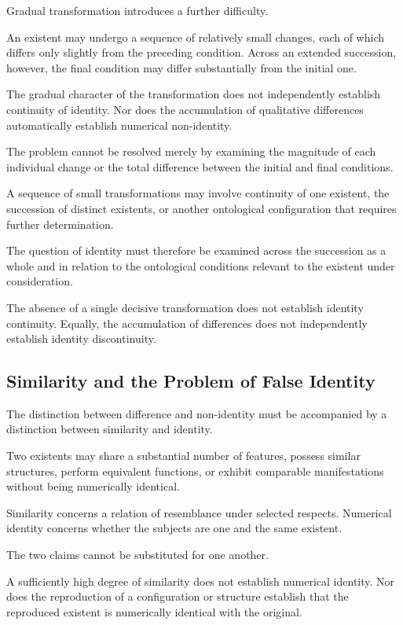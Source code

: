Gradual transformation introduces a further difficulty.

An existent may undergo a sequence of relatively
small changes, each of which differs only slightly
from the preceding condition. Across an extended
succession, however, the final condition may differ
substantially from the initial one.

The gradual character of the transformation does
not independently establish continuity of identity.
Nor does the accumulation of qualitative differences
automatically establish numerical non-identity.

The problem cannot be resolved merely by examining
the magnitude of each individual change or the total
difference between the initial and final conditions.

A sequence of small transformations may involve
continuity of one existent, the succession of distinct
existents, or another ontological configuration
that requires further determination.

The question of identity must therefore be examined
across the succession as a whole and in relation
to the ontological conditions relevant to the
existent under consideration.

The absence of a single decisive transformation
does not establish identity continuity. Equally,
the accumulation of differences does not independently
establish identity discontinuity.

\subsection{Similarity and the Problem of False Identity}

The distinction between difference and non-identity
must be accompanied by a distinction between similarity
and identity.

Two existents may share a substantial number of
features, possess similar structures, perform
equivalent functions, or exhibit comparable
manifestations without being numerically identical.

Similarity concerns a relation of resemblance
under selected respects. Numerical identity concerns
whether the subjects are one and the same existent.

The two claims cannot be substituted for one another.

A sufficiently high degree of similarity does not
establish numerical identity. Nor does the reproduction
of a configuration or structure establish that
the reproduced existent is numerically identical
with the original.

